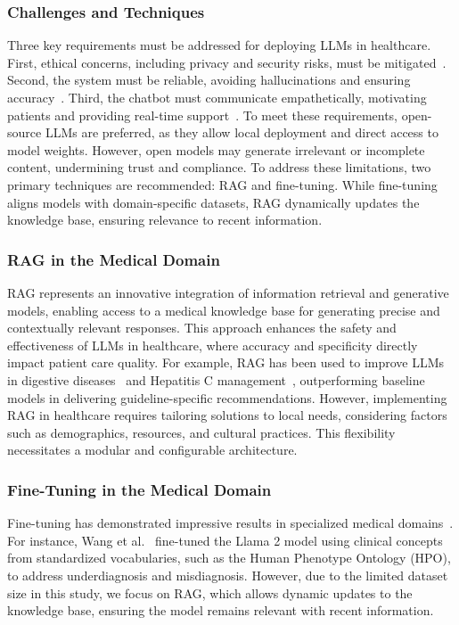 %
\subsubsection{Challenges and Techniques}
%
Three key requirements must be addressed for deploying \glspl{LLM} in healthcare.
%
First, ethical concerns, including privacy and security risks, must be mitigated~\cite{lancet2023}.
%
Second, the system must be reliable, avoiding hallucinations and ensuring accuracy~\cite{EthicsLLMs-NatureDigitalMedicine2024}.
%
Third, the chatbot must communicate empathetically, motivating patients and providing real-time support~\cite{Chatbot-JAMAIntMed2023}.
%
To meet these requirements, open-source \glspl{LLM} are preferred, as they allow local deployment and direct access to model weights.
%
However, open models may generate irrelevant or incomplete content, undermining trust and compliance.
%
To address these limitations, two primary techniques are recommended: \gls{RAG} and fine-tuning.
%
While fine-tuning aligns models with domain-specific datasets, \gls{RAG} dynamically updates the knowledge base, ensuring relevance to recent information.

%
\subsubsection{\Gls{RAG} in the Medical Domain}
%
\Gls{RAG} represents an innovative integration of information retrieval and generative models, enabling access to a medical knowledge base for generating precise and contextually relevant responses.
%
This approach enhances the safety and effectiveness of \glspl{LLM} in healthcare, where accuracy and specificity directly impact patient care quality.
%
For example, \gls{RAG} has been used to improve \glspl{LLM} in digestive diseases~\cite{Giuf2024} and Hepatitis C management~\cite{Kresevic2024-NPJ}, outperforming baseline models in delivering guideline-specific recommendations.
%
However, implementing \gls{RAG} in healthcare requires tailoring solutions to local needs, considering factors such as demographics, resources, and cultural practices.
%
This flexibility necessitates a modular and configurable architecture.

%
\subsubsection{Fine-Tuning in the Medical Domain}
%
Fine-tuning has demonstrated impressive results in specialized medical domains~\cite{Maharjan2024-ScientificReports}.
%
For instance, Wang et al.~\cite{Wang2023-Jamia} fine-tuned the Llama 2 model using clinical concepts from standardized vocabularies, such as the Human Phenotype Ontology (HPO), to address underdiagnosis and misdiagnosis.
%
However, due to the limited dataset size in this study, we focus on \gls{RAG}, which allows dynamic updates to the knowledge base, ensuring the model remains relevant with recent information.


